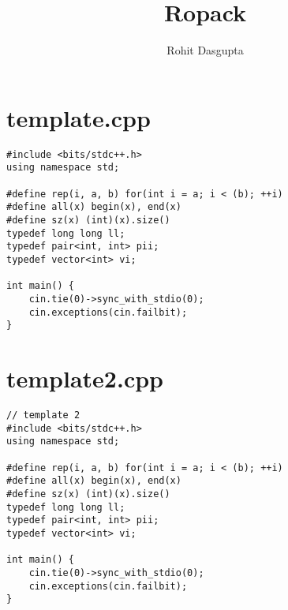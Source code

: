 \documentclass[9pt]{article}
\title{Ropack}
\author{Rohit Dasgupta}
\begin{document}
\maketitle
\begin{multicols*}{3}

\section*{template.cpp}
\begin{lstlisting}
#include <bits/stdc++.h>
using namespace std;

#define rep(i, a, b) for(int i = a; i < (b); ++i)
#define all(x) begin(x), end(x)
#define sz(x) (int)(x).size()
typedef long long ll;
typedef pair<int, int> pii;
typedef vector<int> vi;

int main() {
	cin.tie(0)->sync_with_stdio(0);
	cin.exceptions(cin.failbit);
}

\end{lstlisting}
\section*{template2.cpp}
\begin{lstlisting}
// template 2
#include <bits/stdc++.h>
using namespace std;

#define rep(i, a, b) for(int i = a; i < (b); ++i)
#define all(x) begin(x), end(x)
#define sz(x) (int)(x).size()
typedef long long ll;
typedef pair<int, int> pii;
typedef vector<int> vi;

int main() {
	cin.tie(0)->sync_with_stdio(0);
	cin.exceptions(cin.failbit);
}

\end{lstlisting}
\end{multicols*}
\end{document}
